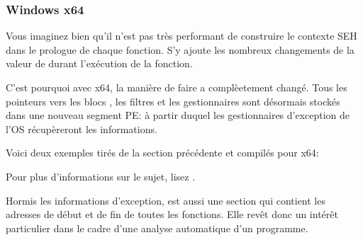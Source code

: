 ﻿\subsubsection{Windows x64}

\label{SEH_win64}

Vous imaginez bien qu'il n'est pas très performant de construire le contexte SEH dans le prologue 
de chaque fonction. S'y ajoute les nombreux changements de la valeur de  
durant l'exécution de la fonction.

C'est pourquoi avec x64, la manière de faire a complèetement changé. Tous les pointeurs vers les 
blocs , les filtres et les gestionnaires sont désormais stockés dans une nouveau segment 
PE:  à partir duquel les gestionnaires d'exception de l'\ac{OS} récupèreront les 
informations.

Voici deux exemples tirés de la section précédente et compilés pour x64:





Pour plus d'informations sur le sujet, lisez \IgorSkochinsky.

Hormis les informations d'exception,  est aussi une section qui contient les adresses 
de début et de fin de toutes les fonctions. Elle revêt donc un intérêt particulier dans le cadre 
d'une analyse automatique d'un programme.

